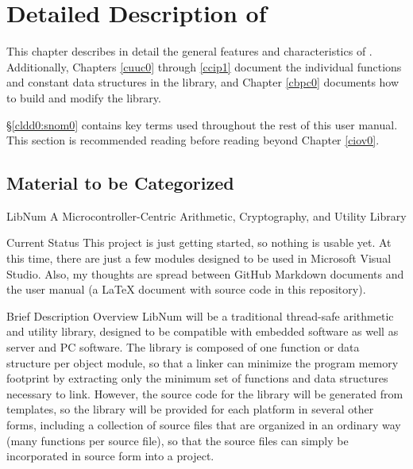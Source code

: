 \chapter{Detailed Description of \emph{\productbasenameshort{}}}
\label{cldd0}

This chapter describes in detail the general features and characteristics
of \emph{\productbasenameshort{}}\@.  Additionally, Chapters \ref{cuuc0}
through \ref{ccip1} document the individual functions and constant data
structures in the library, and Chapter \ref{cbpc0} documents how to build
and modify the library.

\S{}\ref{cldd0:snom0} contains key terms used throughout the rest of this
user manual.  This section is recommended reading before reading beyond
Chapter \ref{ciov0}.

\section{Material to be Categorized}
\label{cldd0:smca0}

LibNum
A Microcontroller-Centric Arithmetic, Cryptography, and Utility Library

Current Status
This project is just getting started, so nothing is usable yet. At this time, 
there are just a few modules designed to be used in Microsoft Visual Studio.
Also, my thoughts are spread between GitHub Markdown documents and the user
manual (a LaTeX document with source code in this repository).

Brief Description
Overview
LibNum will be a traditional thread-safe arithmetic and utility library,
designed to be compatible with embedded software as well as server and PC
software. The library is composed of one function or data structure per
object module, so that a linker can minimize the program memory footprint
by extracting only the minimum set of functions and data structures necessary
to link. However, the source code for the library will be generated from
templates, so the library will be provided for each platform in several other
forms, including a collection of source files that are organized in an
ordinary way (many functions per source file), so that the source files can
simply be incorporated in source form into a project.

